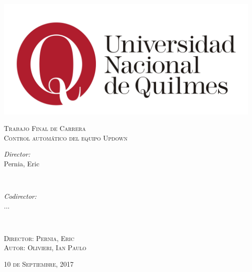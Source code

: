 \documentclass[12pt,spanish]{report}
\begin{document}
\begin{titlepage}
\includegraphics[width=\textwidth]{resources/0-UNQlogo.jpg}\\[1.5cm] %

\begin{center}
\textsc{\LARGE Trabajo Final de Carrera}\\[1cm] %
\textsc{\LARGE Control automático del equipo Updown}\\[1cm] 
\end{center}

\begin{minipage}{0.4\textwidth}
\begin{flushleft} \large
\emph{Director:}\\[0cm]
Pernia, Eric
\end{flushleft}
\end{minipage}
~
\begin{minipage}{0.4\textwidth}
\begin{flushright} \large
\emph{Codirector:} \\[0cm]
...
\end{flushright}
\end{minipage}\\[2cm]

\begin{flushleft} \large
\textsc{\large Director: Pernia, Eric}\\[1cm] %
\textsc{\large Autor: Olivieri, Ian Paulo}\\[2cm] %
\end{flushleft}
\begin{flushright} \large
\textsc{\large 10 de Septiembre, 2017}\\[0.5cm] %
\end{flushright} 

\end{titlepage}


\tableofcontents








\end{document}
